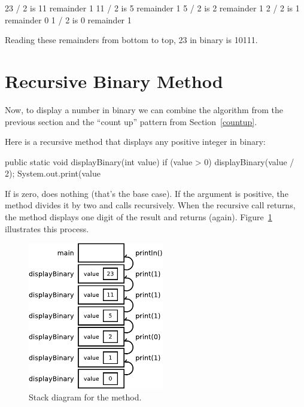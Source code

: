 \begin{stdout}
23 / 2 is 11 remainder 1
11 / 2 is  5 remainder 1
 5 / 2 is  2 remainder 1
 2 / 2 is  1 remainder 0
 1 / 2 is  0 remainder 1
\end{stdout}

Reading these remainders from bottom to top, 23 in binary is 10111.


\section{Recursive Binary Method}

Now, to display a number in binary we can combine the algorithm from the previous section and the ``count up'' pattern from Section~\ref{countup}.

Here is a recursive method that displays any positive integer in binary:

\begin{code}
public static void displayBinary(int value) {
    if (value > 0) {
        displayBinary(value / 2);
        System.out.print(value %
    }
}
\end{code}

If  is zero,  does nothing (that's the base case).
If the argument is positive, the method divides it by two and calls  recursively.
When the recursive call returns, the method displays one digit of the result and returns (again).
Figure~\ref{fig.stack4} illustrates this process.


\begin{figure}[!ht]
\begin{center}
\includegraphics[width=168pt]{figs/stack4.pdf}
\caption{Stack diagram for the  method.}
\label{fig.stack4}
\end{center}
\end{figure}

